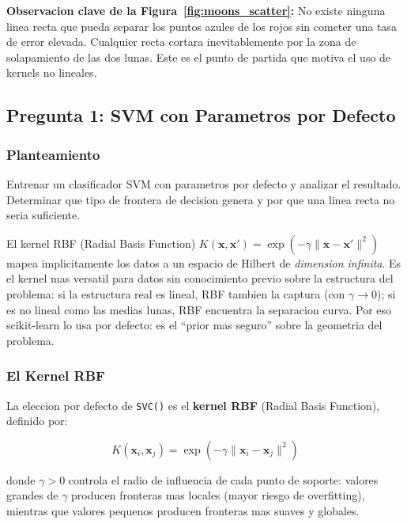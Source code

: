 \documentclass[12pt,a4paper]{article}
\begin{document}
\textbf{Observacion clave de la Figura~\ref{fig:moons_scatter}:} No existe ninguna linea recta
que pueda separar los puntos azules de los rojos sin cometer una tasa de error elevada. Cualquier
recta cortara inevitablemente por la zona de solapamiento de las dos lunas. Este es el punto de
partida que motiva el uso de kernels no lineales.

\subsection{Pregunta 1: SVM con Parametros por Defecto}

\subsubsection*{Planteamiento}
Entrenar un clasificador SVM con parametros por defecto y analizar el resultado. Determinar que
tipo de frontera de decision genera y por que una linea recta no seria suficiente.

\begin{tcolorbox}[porquebox, title={Por que el kernel RBF es el default?}]
El kernel RBF (Radial Basis Function) $K(\mathbf{x},\mathbf{x}') = \exp(-\gamma
\|\mathbf{x}-\mathbf{x}'\|^2)$ mapea implicitamente los datos a un espacio de Hilbert de
\textit{dimension infinita}. Es el kernel mas versatil para datos sin conocimiento previo sobre
la estructura del problema: si la estructura real es lineal, RBF tambien la captura (con
$\gamma \to 0$); si es no lineal como las medias lunas, RBF encuentra la separacion curva. Por
eso scikit-learn lo usa por defecto: es el ``prior mas seguro'' sobre la geometria del problema.
\end{tcolorbox}

\subsubsection*{El Kernel RBF}

La eleccion por defecto de \texttt{SVC()} es el \textbf{kernel RBF} (Radial Basis Function),
definido por:

\begin{equation}
  K(\mathbf{x}_i, \mathbf{x}_j) = \exp\!\left(-\gamma \|\mathbf{x}_i - \mathbf{x}_j\|^2\right)
  \label{eq:rbf}
\end{equation}

donde $\gamma > 0$ controla el radio de influencia de cada punto de soporte: valores grandes de
$\gamma$ producen fronteras mas locales (mayor riesgo de overfitting), mientras que valores
pequenos producen fronteras mas suaves y globales.
\end{document}
